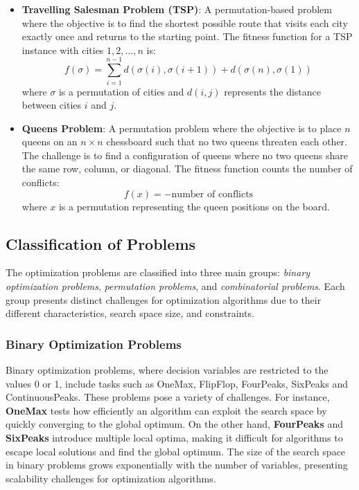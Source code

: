 \begin{itemize}
    \item \textbf{Travelling Salesman Problem (TSP)}: A permutation-based problem where the objective is to find the shortest possible route that visits each city exactly once and returns to the starting point. The fitness function for a TSP instance with cities \(1, 2, ..., n\) is:
    \[
    f(\sigma) = \sum_{i=1}^{n-1} d(\sigma(i), \sigma(i+1)) + d(\sigma(n), \sigma(1))
    \]
    where \( \sigma \) is a permutation of cities and \( d(i,j) \) represents the distance between cities \(i\) and \(j\).

    \item \textbf{Queens Problem}: A permutation problem where the objective is to place \( n \) queens on an \( n \times n \) chessboard such that no two queens threaten each other. The challenge is to find a configuration of queens where no two queens share the same row, column, or diagonal. The fitness function counts the number of conflicts:
    \[
    f(x) = - \text{number of conflicts}
    \]
    where \( x \) is a permutation representing the queen positions on the board.
\end{itemize}

\subsection{Classification of Problems}
The optimization problems are classified into three main groups: \textit{binary optimization problems}, \textit{permutation problems}, and \textit{combinatorial problems}. Each group presents distinct challenges for optimization algorithms due to their different characteristics, search space size, and constraints.

\subsubsection{Binary Optimization Problems}
Binary optimization problems, where decision variables are restricted to the values 0 or 1, include tasks such as OneMax, FlipFlop, FourPeaks, SixPeaks and ContinuousPeaks. These problems pose a variety of challenges. For instance, \textbf{OneMax} tests how efficiently an algorithm can exploit the search space by quickly converging to the global optimum. On the other hand, \textbf{FourPeaks} and \textbf{SixPeaks} introduce multiple local optima, making it difficult for algorithms to escape local solutions and find the global optimum. The size of the search space in binary problems grows exponentially with the number of variables, presenting scalability challenges for optimization algorithms.

